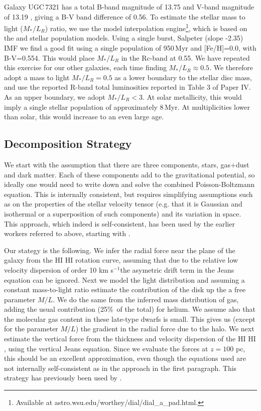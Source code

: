 \documentclass[useAMS,usenatbib]{mn2e}
\newcommand{\kms}{{km s$^{-1}$}}
\newcommand{\hi}{%
  \relax
  \ifmmode
    \textrm{\textsc{HI}}
  \else
    \textsc{H{\smaller}I}
  \fi
}
\begin{document}
Galaxy UGC\,7321 has a total B-band magnitude of 13.75 and V-band magnitude 
of 13.19 \citep{Taylor2005}, giving a B-V band difference of 
0.56.\label{sec:estimateML}
To estimate the stellar mass to light ($M_*/L_R$) ratio, we use the model 
interpolation engine\footnote{Available at 
astro.wsu.edu/worthey/dial/dial\_a\_pad.html.}, 
which is based on the \citet{Worthey1994A} and 
\citet{Bertelli1994A} stellar population models.
Using a single burst, Salpeter (slope -2.35) IMF we find 
a good fit using a single population of 950\,Myr and [Fe/H]=0.0, with 
B-V=0.554. 
This would place $M_*/L_R$ in the Rc-band at 0.55.
We have repeated this exercise for our other galaxies, each time finding 
$M_*/L_R\approx0.5$. 
We therefore adopt a mass to light $M_*/L_{R}=0.5$ as a lower boundary to 
the stellar disc mass, and use the reported R-band total luminosities 
reported in Table 3 of Paper IV.
As an upper boundary, we adopt $M_*/L_{R}<3$. At solar metallicity, this 
would imply a single stellar population of approximately 8\,Myr. At 
multiplicities lower than solar, this would increase to an even large age.

\label{sec:MLdiscussion}

\subsection{Decomposition Strategy}
We start with the assumption that there are three components, stars, 
gas+dust and dark matter. Each of these components add to the gravitational 
potential, so ideally one would need to write down and solve the combined 
Poisson-Boltzmann equation. This is internally consistent, but requires
simplifying assumptions such as 
on the properties of the stellar velocity tensor (e.g. that it is Gaussian and
isothermal or a superposition of such components) 
and its variation in space. This approach, which indeed is self-consistent, 
has been used by the earlier workers referred to above, starting with 
\citet{Olling1996A}. 

Our stategy is the following. We infer the radial force near the plane of the 
galaxy from the \hi rotation curve, assuming that due to the relative low 
velocity dispersion of order 10 \kms the asymetric drift term in the Jeans 
equation can be ignored. Next we model the light distribution and assuming a 
constant mass-to-light ratio estimate the contribution of the disk up the a 
free parameter $M/L$. We do the same from the inferred mass distribution of 
gas, adding the usual contribution (25\%\ of the total) for helium. We assume 
also that the molecular gas content in these late-type dwarfs is small. This 
gives us (except for the parameter $M/L$) the gradient in the radial force 
due to the halo. We next estimate the vertical force from the thickness and 
velocity dispersion of the \hi, using the vertical Jeans equation. Since we 
evaluate the forces at $z = 100$ pc, this  should be 
an excellent approximation, even though the equations used are not internally
self-consistent as in the approach in the first paragraph.
This strategy has previously been used by \citet{OBrien2010D}.
\end{document}
